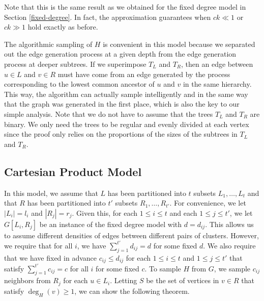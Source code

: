Note that this is the same result as we obtained for the fixed degree
model in Section \ref{fixed-degree}. In fact, the approximation
guarantees when $ck \ll 1$ or $ck \gg 1$ hold exactly as before.\vs

The algorithmic sampling of $H$ is convenient in this model because we separated
out the edge generation process at a given depth from the edge
generation process at deeper subtrees.
If we superimpose $T_L$
and $T_R$, then an edge between $u\in L$ and $v\in R$ must have
come from an edge generated by the process corresponding to the lowest common ancestor of $u$ and $v$ in the same hierarchy. This way, the algorithm can actually sample intelligently and in the same way that the graph was generated in the first place, which is also the key to our simple analysis. Note
that we do not have to assume that the trees $T_L$ and $T_R$ are
binary. We only need the trees to be regular and evenly divided at
each vertex since the proof only relies on the proportions of the
sizes of the subtrees in $T_L$ and $T_R$.


\subsection{Cartesian Product Model}
\label{cartesian}
In this model, we assume that
$L$ has been partitioned into $t$ subsets $L_1,\ldots, L_t$ and
that $R$ has been partitioned into $t'$ subsets $R_1,\ldots,
R_{t'}$. For convenience, we let $|L_i| = l_i$ and $|R_j|=r_j$. Given
this, for each $1\leq i\leq t$ and each $1\leq j\leq t'$,
we let $G[L_i, R_j]$ be an instance of the fixed degree model with
$d=d_{ij}$. This allows us to assume different densities of edges between different pairs of clusters.
However, we require that for all $i$, we have $\sum_{j=1}^{t'}
d_{ij} = d$ for some fixed $d$. We also require that we have fixed in
advance $c_{ij} \leq d_{ij}$ for each $1\leq i\leq t$ and $1\leq j\leq t'$ that
satisfy $\sum_{j=1}^{t'} c_{ij} = c$ for all $i$ for some fixed $c$.
To sample $H$ from $G$, we sample $c_{ij}$ neighbors from $R_j$ for each
$u\in L_i$. Letting $S$ be the set of vertices in
$v\in R$ that satisfy $\deg_H(v)\geq 1$, we can show the following theorem.

